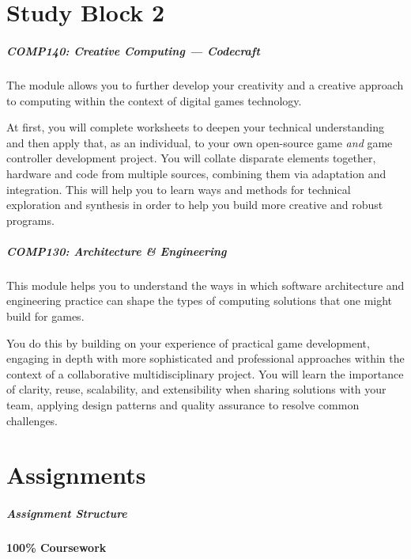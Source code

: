 \part{Study Block 2}
\frame{\partpage}

\begin{frame}
	\frametitle{\Large{COMP140: Creative Computing --- Codecraft}}
	
	The module allows you to further develop your creativity and a creative approach to computing within the context of digital games technology.
	
	\vspace{2em}
	
	At first, you will complete worksheets to deepen your technical understanding and then apply that, as an individual, to your own open-source game \textit{and} game controller development project. You will collate disparate elements together, hardware and code from multiple sources, combining them via adaptation and integration. This will help you to learn ways and methods for technical exploration and synthesis in order to help you build more creative and robust programs. 

\end{frame}

\begin{frame}
	\frametitle{\Large{COMP130: Architecture \& Engineering}}
	
	This module helps you to understand the ways in which software architecture and engineering practice can shape the types of computing solutions that one might build for games.
	
	\vspace{2em}
	
	You do this by building on your experience of practical game development, engaging in depth with more sophisticated and professional approaches within the context of a collaborative multidisciplinary project. You will learn the importance of clarity, reuse, scalability, and extensibility when sharing solutions with your team, applying design patterns and quality assurance to resolve common challenges.

\end{frame}

\part{Assignments}
\frame{\partpage}

\begin{frame}
	\frametitle{Assignment Structure}
	
	\begin{Huge}
		\begin{center}
			\textbf{100\% Coursework}
		\end{center}
	\end{Huge}

\end{frame}

